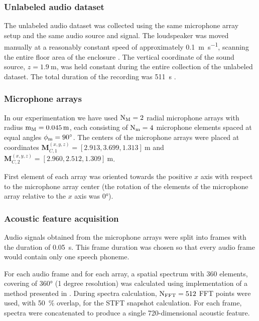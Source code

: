 \documentclass[applsci,article,submit,moreauthors,pdftex]{Definitions/mdpi}
\begin{document}
\subsubsection{Unlabeled audio dataset}
The unlabeled audio dataset was collected using the same microphone array setup and the same audio source and signal. The loudspeaker was moved manually at a reasonably constant speed of approximately \SI{0.1}{\m\per\s}, scanning the entire floor area of the enclosure . The vertical coordinate of the sound source, $ z = \SI{1.9}{\m} $, was held constant during the entire collection of the unlabeled dataset. 
The total duration of the recording was \SI{511}{\s} .

\subsubsection{Microphone arrays}
In our experimentation we have used $ \mathrm{N}_{\mathrm{M}} = 2 $ radial microphone arrays with radius $ \radius_{\arr} = \SI{0.045}{\m} $, each consisting of $ \mathrm{N}_{\mathrm{m}} = 4 $ microphone elements spaced at equal angles $ \phi_{\mathrm{m}} = \ang{90} $. The centers of the microphone arrays were placed at coordinates $ \mathbf{M}_{C,1}^{(x,y,z)} = [2.913, 3.699, 1.313]~\si{\m} $ and $ \mathbf{M}_{C,2}^{(x,y,z)} = [2.960, 2.512, 1.309]~\si{\m} $.

First element of each array was oriented towards the positive $ x $ axis with respect to the microphone array center (the rotation of the elements of the microphone array relative to the $ x $ axis was \ang{0}). 

\subsubsection{Acoustic feature acquisition}

Audio signals obtained from the microphone arrays were split into frames with the duration of \SI{0.05}{\s}. This frame duration was chosen so that every audio frame would contain only one speech phoneme.

For each audio frame and for each array, a \srpphat{} spatial spectrum with 360 elements, covering \doa{} of \ang{360} (1 degree resolution) was calculated using \pra{} \python{} implementation \cite{scheiblerr.etal.PyroomacousticsPythonPackage2017} of a method presented in \cite{dibiaseHighaccuracyLowlatencyTechnique2000}. During \srpphat{} spectra calculation, $ \mathrm{N}_{\mathrm{FFT}}{} = 512 $ FFT points were used, with \SI{50}{\percent} overlap, for the STFT snapshot calculation. For each frame, \srpphat{} spectra were concatenated to produce a single 720-dimensional acoustic feature.
\end{document}
